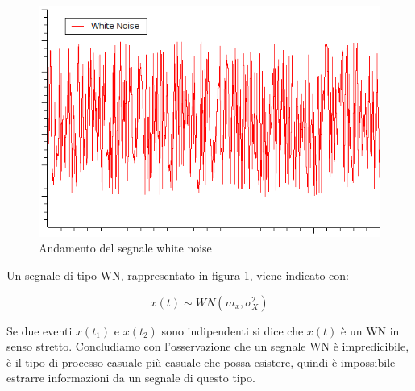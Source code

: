 \begin{figure}[htbp]
  \centering
  \includegraphics[scale=0.5]{img/whitenoise.png}
  \caption{Andamento del segnale white noise\label{fig:WN}}
\end{figure}

\noindent Un segnale di tipo WN, rappresentato in figura \ref{fig:WN}, viene indicato con:

\[x(t)\sim WN(m_x,\sigma_X^2) \]

Se due eventi $x(t_1)$ e $x(t_2)$ sono indipendenti si dice che $x(t)$ è un WN in senso stretto. Concludiamo con l'osservazione che un segnale WN è impredicibile, è il tipo di processo casuale più casuale che possa esistere, quindi è impossibile estrarre informazioni da un segnale di questo tipo.
